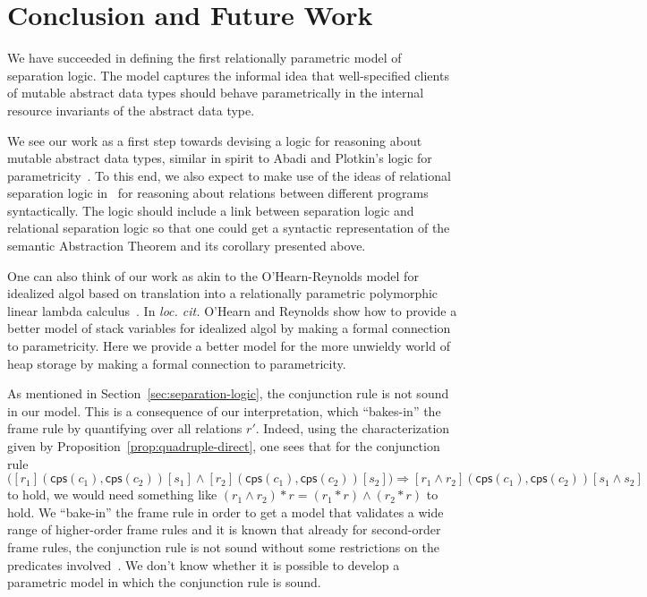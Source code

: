 \documentclass{LMCS}
\newcommand{\squad}[4]{{[{#1}]}
                        ({#2},  {#3})
                       {[{#4}]}}
\newcommand{\cps}{\mathsf{cps}}
\begin{document}
\section{Conclusion and Future Work}\label{sec:discussion-futurework}

We have succeeded in defining the first relationally parametric model of
separation logic. The model captures the informal idea that well-specified
clients of mutable abstract data types should behave parametrically in the
internal resource invariants of the abstract data type.

We see our work as a first step towards devising a logic for reasoning
about mutable abstract data types, similar in spirit to Abadi and
Plotkin's logic for parametricity~\cite{abadi-plotkin,BirkedalL:defp-mscs}. 
To this end, we also
expect to make use of the ideas of
relational separation logic in~\cite{yang-relational-separation-logic}
for reasoning about relations between different programs syntactically.
The logic should include a link between separation logic and
relational separation logic so that one could get a syntactic
representation of the semantic Abstraction Theorem and its corollary
presented above.

One can also think of our work as akin to the O'Hearn-Reynolds model for
idealized algol based on translation into a relationally parametric
polymorphic linear lambda calculus~\cite{ohearn-reynolds}.  In \emph{loc.
  cit.} O'Hearn and Reynolds show how to provide a better model of stack
variables for idealized algol by making a formal connection to
parametricity. Here we provide a better model for the more unwieldy world
of heap storage by making a formal connection to parametricity.

As mentioned in Section~\ref{sec:separation-logic}, 
the conjunction rule is not sound in our model. This is a consequence of
our interpretation, which ``bakes-in'' the frame rule by quantifying
over all relations $r'$. Indeed, using the characterization given by
Proposition~\ref{prop:quadruple-direct}, one sees that for the conjunction
rule 
\[\big(\squad{r_1}{\cps(c_1)}{\cps(c_2)}{s_1} \land
  \squad{r_2}{\cps(c_1)}{\cps(c_2)}{s_2} \big) \Longrightarrow
  \squad{r_1\land r_2}{\cps(c_1)}{\cps(c_2)}{s_1\land s_2}
\]
to hold, we would need something like $(r_1\land r_2)*r = (r_1*r)\land (r_2
*r)$ to hold. We ``bake-in'' the frame rule in order to get a model
that validates a wide range of higher-order frame rules and it is known
that already for second-order frame rules, the conjunction rule is not
sound without some restrictions on the predicates
involved~\cite{yang-ohearn-reynolds-popl04}. 
We don't know whether it is possible to
develop a parametric model in which the conjunction rule is sound. 
\end{document}
